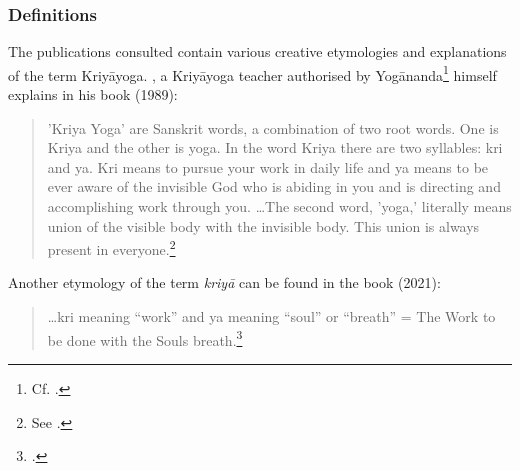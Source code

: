 \subsubsection{Definitions}

The publications consulted contain various creative etymologies and explanations of the term Kriyāyoga. \citeauthor{hariharananda1989}, a Kriyāyoga teacher authorised by Yogānanda\footnote{Cf. \citeauthor[1989: 16]{hariharananda1989}.} himself explains in his book  (1989): \begin{quote} 'Kriya Yoga' are Sanskrit words, a combination of two root words. One is Kriya and the other is yoga. In the word Kriya there are two syllables: kri and ya. Kri means to pursue your work in daily life and ya means to be ever aware of the invisible God who is abiding in you and is directing and accomplishing work through you. \ldots  The second word, 'yoga,' literally means union of the visible body with the invisible body. This union is always present in everyone.\footnote{See \citeauthor[1989: 83]{hariharananda1989}.}\end{quote}
Another etymology of the term \textit{kriyā} can be found in the book  (2021): \begin{quote} \ldots kri meaning ``work'' and ya meaning ``soul'' or ``breath'' = The Work to be done with the Souls breath.\footnote{\citeauthor[2021: 91]{kriyayogalowenstein}.}\end{quote}
